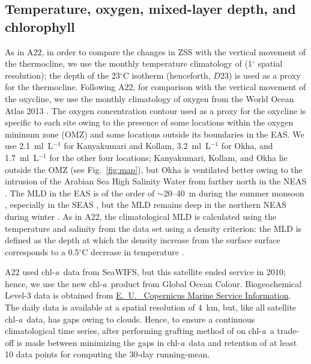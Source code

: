 \documentclass[authoryear,review,11pt]{elsarticle}
\newcommand{\chla}{chl-{\emph{a}}}
\begin{document}
\subsection{Temperature, oxygen, mixed-layer depth, and chlorophyll}
\label{sec:data.misc}

As in A22, in order to compare the changes in ZSS with the vertical movement of the thermocline, we use the monthly temperature climatology of \citet{chatterjee2012new} (1$^{\circ}$ spatial resolution); the depth of the 23$^{\circ}$C isotherm (henceforth, $D23$) is used as a proxy for the thermocline. Following A22, for comparison with the vertical movement of the oxycline, we use the monthly climatology of oxygen from the World Ocean Atlas 2013 \citep{garcia2013oxygen}.  The oxygen concentration contour used as a proxy for the oxycline is specific to each site owing to the presence of some locations within the oxygen minimum zone (OMZ) and some locations outside its boundaries in the EAS. We use 2.1~ml~L$^{-1}$ for Kanyakumari and Kollam, 3.2~ml~L$^{-1}$ for Okha, and 1.7~ml~L$^{-1}$ for the other four locations; Kanyakumari, Kollam, and Okha lie outside the OMZ (see Fig.~\ref{fig:map}), but Okha is ventilated better owing to the intrusion of the Arabian Sea High Salinity Water \citep[ASHSW;][]{rochford1964salinity, wyrtki1971oceanographic} from farther north in the NEAS \citep{banse2009wintertime, naqvi2006coastal, shankar2016inhibition}. The MLD in the EAS is of the order of $\sim$20--40~m during the summer monsoon \citep{shetye1990hydrography, shankar2002hydrography, sreenivas2008monthly}, especially in the SEAS \citep{shenoi2005hydrography}, but the MLD remains deep in the northern NEAS during winter \citep{shankar2016inhibition}. As in A22, the climatological MLD is calculated using the temperature and salinity from the \citet{chatterjee2012new} data set using a density criterion: the MLD is defined as the depth at which the density increase from the surface surface corresponds to a 0.5$^\circ$C decrease in temperature \citep{shenoi2004remote}. 

A22 used \chla\ data from SeaWIFS, but this satellite ended service in 2010; hence, we use the new \chla\ product from Global Ocean Colour. Biogeochemical Level-3 data is obtained from \href{https://doi.org/10.48670/moi-00280}{E.~U.~ Copernicus Marine Service Information}. The daily data is available at a spatial resolution of 4~km, but, like all satellite \chla\ data, has gaps owing to clouds. Hence, to ensure a continuous climatological time series, after performing grafting method of \citet{mukhopadhyay2017st} on \chla\, a trade-off is made between minimizing the gaps in \chla\ data and retention of at least 10 data points for computing the 30-day running-mean.
\end{document}
